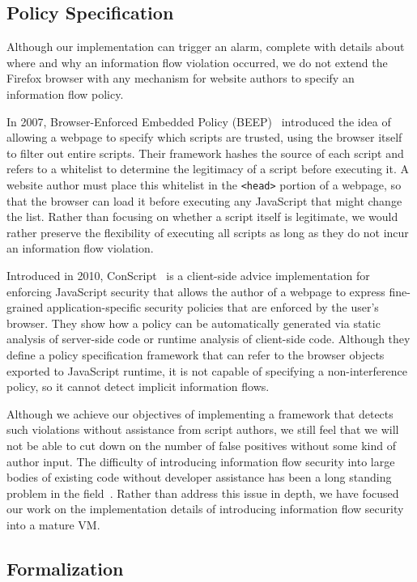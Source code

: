 \subsection{Policy Specification}
\label{sec:policy_specification}

Although our implementation can trigger an alarm, complete with details about where and why an information flow violation occurred, we do not extend the Firefox browser with any mechanism for website authors to specify an information flow policy.

In 2007, Browser-Enforced Embedded Policy (BEEP)~\cite{beep} introduced the idea of allowing a webpage to specify which scripts are trusted, using the browser itself to filter out entire scripts.
Their framework hashes the source of each script and refers to a whitelist to determine the legitimacy of a script before executing it.
A website author must place this whitelist in the \texttt{<head>} portion of a webpage, so that the browser can load it before executing any JavaScript that might change the list.
Rather than focusing on whether a script itself is legitimate, we would rather preserve the flexibility of executing all scripts as long as they do not incur an information flow violation.

Introduced in 2010, ConScript~\cite{5504806} is a client-side advice implementation for enforcing JavaScript security that allows the author of a webpage to express fine-grained application-specific security policies that are enforced by the user's browser.
They show how a policy can be automatically generated via static analysis of server-side code or runtime analysis of client-side code.
Although they define a policy specification framework that can refer to the browser objects exported to JavaScript runtime, it is not capable of specifying a non-interference policy, so it cannot detect implicit information flows.

Although we achieve our objectives of implementing a framework that detects such violations without assistance from script authors,  we still feel that we will not be able to cut down on the number of false positives without some kind of author input.
The difficulty of introducing information flow security into large bodies of existing code without developer assistance has been a long standing problem in the field~\cite{1159651}.
Rather than address this issue in depth, we have focused our work on the implementation details of introducing information flow security into a mature VM.

\subsection{Formalization}

